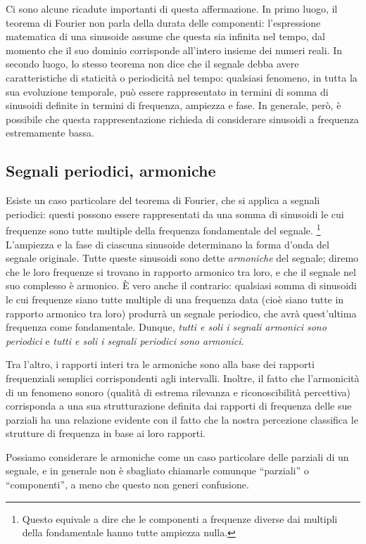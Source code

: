 Ci sono alcune ricadute importanti di questa affermazione. In primo luogo, il teorema di Fourier non parla della durata delle componenti: l'espressione matematica di una sinusoide assume che questa sia infinita nel tempo, dal momento che il suo dominio corrisponde all'intero insieme dei numeri reali. In secondo luogo, lo stesso teorema non dice che il segnale debba avere caratteristiche di staticità o periodicità nel tempo: qualsiasi fenomeno, in tutta la sua evoluzione temporale, può essere rappresentato in termini di somma di sinusoidi definite in termini di frequenza, ampiezza e fase. In generale, però, è possibile che questa rappresentazione richieda di considerare sinusoidi a frequenza estremamente bassa.


\subsection{Segnali periodici, armoniche}

Esiste un caso particolare del teorema di Fourier, che si applica a segnali periodici: questi possono essere rappresentati da una somma di sinusoidi le cui frequenze sono tutte multiple della frequenza fondamentale del segnale.%
\footnote{Questo equivale a dire che le componenti a frequenze diverse dai multipli della fondamentale hanno tutte ampiezza nulla.}
L'ampiezza e la fase di ciascuna sinusoide determinano la forma d'onda del segnale originale. Tutte queste sinusoidi sono dette \emph{armoniche} del segnale; diremo che le loro frequenze si trovano in rapporto armonico tra loro, e che il segnale nel suo complesso è armonico. È vero anche il contrario: qualsiasi somma di sinusoidi le cui frequenze siano tutte multiple di una frequenza data (cioè siano tutte in rapporto armonico tra loro) produrrà un segnale periodico, che avrà quest'ultima frequenza come fondamentale. Dunque, \emph{tutti e soli i segnali armonici sono periodici} e \emph{tutti e soli i segnali periodici sono armonici}.

Tra l'altro, i rapporti interi tra le armoniche sono alla base dei rapporti frequenziali semplici corrispondenti agli intervalli. Inoltre, il fatto che l'armonicità di un fenomeno sonoro (qualità di estrema rilevanza e riconoscibilità percettiva) corrisponda a una sua strutturazione definita dai rapporti di frequenza delle sue parziali ha una relazione evidente con il fatto che la nostra percezione classifica le strutture di frequenza in base ai loro rapporti.

Possiamo considerare le armoniche come un caso particolare delle parziali di un segnale, e in generale non è sbagliato chiamarle comunque ``parziali'' o ``componenti'', a meno che questo non generi confusione.

